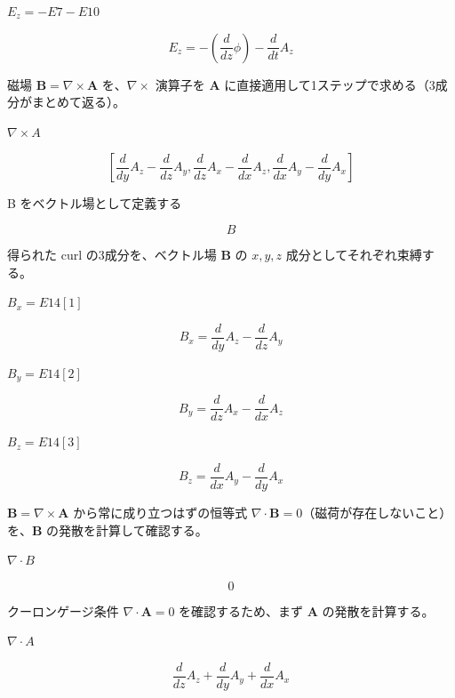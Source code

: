 \documentclass[dvipdfmx,a4paper,11pt]{jsarticle}
\begin{document}
$E_z = -E7 - E10$

\begin{equation}
  E_z = -\left(\frac{d}{d z} \phi\right)-\frac{d}{d t} A_{z}
  \label{eq:E13}
\end{equation}

磁場 $\mathbf B=\nabla\times\mathbf A$ を、$\nabla\times$ 演算子を $\mathbf A$ に直接適用して1ステップで求める（3成分がまとめて返る）。

$\nabla \times A$

\begin{equation}
  \left[ \frac{d}{d y} A_{z}-\frac{d}{d z} A_{y} , \frac{d}{d z} A_{x}-\frac{d}{d x} A_{z} , \frac{d}{d x} A_{y}-\frac{d}{d y} A_{x} \right]
  \label{eq:E14}
\end{equation}

B をベクトル場として定義する

\[
  B
\]

得られた curl の3成分を、ベクトル場 $\mathbf B$ の $x,y,z$ 成分としてそれぞれ束縛する。

$B_x = E14[1]$

\begin{equation}
  B_x = \frac{d}{d y} A_{z}-\frac{d}{d z} A_{y}
  \label{eq:E15}
\end{equation}

$B_y = E14[2]$

\begin{equation}
  B_y = \frac{d}{d z} A_{x}-\frac{d}{d x} A_{z}
  \label{eq:E16}
\end{equation}

$B_z = E14[3]$

\begin{equation}
  B_z = \frac{d}{d x} A_{y}-\frac{d}{d y} A_{x}
  \label{eq:E17}
\end{equation}

$\mathbf B=\nabla\times\mathbf A$ から常に成り立つはずの恒等式 $\nabla\cdot\mathbf B=0$（磁荷が存在しないこと）を、$\mathbf B$ の発散を計算して確認する。

$\nabla \cdot B$

\begin{equation}
  0
  \label{eq:E18}
\end{equation}

クーロンゲージ条件 $\nabla\cdot\mathbf A=0$ を確認するため、まず $\mathbf A$ の発散を計算する。

$\nabla \cdot A$

\begin{equation}
  \frac{d}{d z} A_{z}+\frac{d}{d y} A_{y}+\frac{d}{d x} A_{x}
  \label{eq:E19}
\end{equation}
\end{document}
